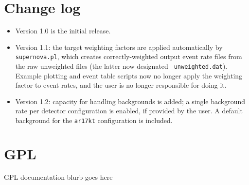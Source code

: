 \documentclass[12pt]{article}
\begin{document}
\appendix
\section{Change log}

\begin{itemize}
\item Version 1.0 is the initial release.
\item Version 1.1:  the target weighting factors are applied automatically by \texttt{supernova.pl}, which creates correctly-weighted output event rate files from the raw unweighted files (the latter now designated \texttt{\_unweighted.dat}).  Example plotting and event table scripts now no longer apply the weighting factor to event rates, and the user is no longer responsible for doing it.
\item Version 1.2: capacity for handling backgrounds is added; a single background rate per detector configuration is enabled, if provided by the user.  A default background for the \texttt{ar17kt} configuration is included.

 \end{itemize}


\section{GPL}

GPL documentation blurb goes here




\end{document}
